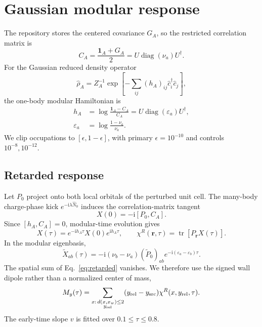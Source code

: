 \documentclass[aps,prx,twocolumn,superscriptaddress,nofootinbib,floatfix]{revtex4-2}
\DeclareMathOperator{\diag}{diag}
\newcommand{\ii}{\mathrm{i}}
\newcommand{\tr}{\operatorname{tr}}
\begin{document}
\section{Gaussian modular response}

The repository stores the centered covariance $G_A$, so the restricted correlation
matrix is
\begin{equation}
 C_A=\frac{\mathbf{1}_A+G_A}{2}
    =U\diag(\nu_a)U^\dagger .
\end{equation}
For the Gaussian reduced density operator
\begin{equation}
 \hat\rho_A=Z_A^{-1}\exp\!\left[-\sum_{ij}(h_A)_{ij}
 \hat c_i^\dagger\hat c_j\right],
\end{equation}
the one-body modular Hamiltonian is
\begin{equation}
 \begin{aligned}
 h_A&=\log\frac{\mathbf{1}_A-C_A}{C_A}
 =U\diag(\varepsilon_a)U^\dagger,\\
 \varepsilon_a&=\log\frac{1-\nu_a}{\nu_a}.
 \end{aligned}
\end{equation}
We clip occupations to $[\epsilon,1-\epsilon]$, with primary
$\epsilon=10^{-10}$ and controls $10^{-8},10^{-12}$.

\subsection{Retarded response}

Let $P_0$ project onto both local orbitals of the perturbed unit cell.  The many-body
charge-phase kick $e^{-\ii\lambda\hat N_0}$ induces the correlation-matrix tangent
\begin{equation}
 X(0)=-\ii[P_0,C_A].
\end{equation}
Since $[h_A,C_A]=0$, modular-time evolution gives
\begin{equation}
 X(\tau)=e^{-\ii h_A\tau}X(0)e^{\ii h_A\tau},\qquad
 \chi^R(\boldsymbol r,\tau)=\tr[P_{\boldsymbol r}X(\tau)].
 \label{eq:retarded}
\end{equation}
In the modular eigenbasis,
\begin{equation}
 \widetilde X_{ab}(\tau)=-\ii(\nu_b-\nu_a)(\widetilde P_0)_{ab}
 e^{-\ii(\varepsilon_a-\varepsilon_b)\tau}.
\end{equation}
The spatial sum of Eq.~\eqref{eq:retarded} vanishes.  We therefore use the signed wall
dipole rather than a normalized center of mass,
\begin{equation}
 M_y(\tau)=\sum_{\substack{x:\,d(x,x_w)\leq2\\y_{\rm rel}}}
 (y_{\rm rel}-y_{\rm src})\chi^R(x,y_{\rm rel},\tau).
\end{equation}
The early-time slope $v$ is fitted over $0.1\leq\tau\leq0.8$.
\end{document}
